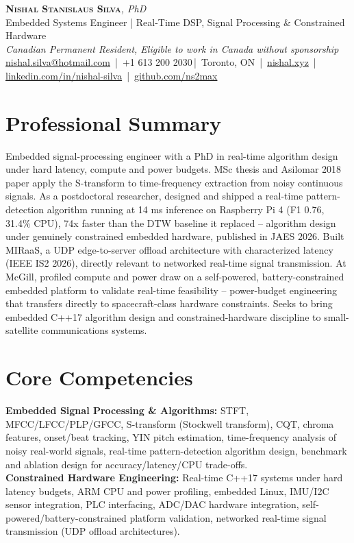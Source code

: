 \documentclass[11pt]{article}
\makeatletter
\newcommand{\cvName}{Nishal Stanislaus Silva}
\newcommand{\cvEmail}{nishal.silva@hotmail.com}
\newcommand{\cvPhone}{+1 613 200 2030}
\newcommand{\cvCity}{Toronto, ON}
\newcommand{\cvSite}{https://nishal.xyz}
\newcommand{\cvLinkedIn}{https://www.linkedin.com/in/nishal-silva}
\newcommand{\cvGitHub}{https://github.com/ns2max}
\newcommand{\cvStatus}{Canadian Permanent Resident, Eligible to work in Canada without sponsorship}
\newcommand{\cvTagline}{Embedded Systems Engineer | Real-Time DSP, Signal Processing \& Constrained Hardware}
\makeatother
\begin{document}
\pagestyle{empty}
\begin{center}
    {\LARGE \scshape \textbf{\cvName}}{\large \textit{, PhD}}\\[1pt]
    {\small \cvTagline}\\[1pt]
    {\footnotesize\textit{\cvStatus}}\\[1pt]
    {\small
    \href{mailto:\cvEmail}{\cvEmail} \,|\, \cvPhone \,|\, \cvCity
    \,|\, \href{\cvSite}{nishal.xyz} \,|\, \href{\cvLinkedIn}{linkedin.com/in/nishal-silva}
    \,|\, \href{\cvGitHub}{github.com/ns2max}}
\end{center}

\section*{Professional Summary}
Embedded signal-processing engineer with a PhD in real-time algorithm design under hard latency, compute and power budgets. MSc thesis and Asilomar 2018 paper apply the S-transform to time-frequency extraction from noisy continuous signals. As a postdoctoral researcher, designed and shipped a real-time pattern-detection algorithm running at 14 ms inference on Raspberry Pi 4 (F1 0.76, 31.4\% CPU), 74x faster than the DTW baseline it replaced -- algorithm design under genuinely constrained embedded hardware, published in JAES 2026. Built MIRaaS, a UDP edge-to-server offload architecture with characterized latency (IEEE IS2 2026), directly relevant to networked real-time signal transmission. At McGill, profiled compute and power draw on a self-powered, battery-constrained embedded platform to validate real-time feasibility -- power-budget engineering that transfers directly to spacecraft-class hardware constraints. Seeks to bring embedded C++17 algorithm design and constrained-hardware discipline to small-satellite communications systems.

\section*{Core Competencies}
\textbf{Embedded Signal Processing \& Algorithms:} STFT, MFCC/LFCC/PLP/GFCC, S-transform (Stockwell transform), CQT, chroma features, onset/beat tracking, YIN pitch estimation, time-frequency analysis of noisy real-world signals, real-time pattern-detection algorithm design, benchmark and ablation design for accuracy/latency/CPU trade-offs. \\
\textbf{Constrained Hardware Engineering:} Real-time C++17 systems under hard latency budgets, ARM CPU and power profiling, embedded Linux, IMU/I2C sensor integration, PLC interfacing, ADC/DAC hardware integration, self-powered/battery-constrained platform validation, networked real-time signal transmission (UDP offload architectures).
\end{document}
